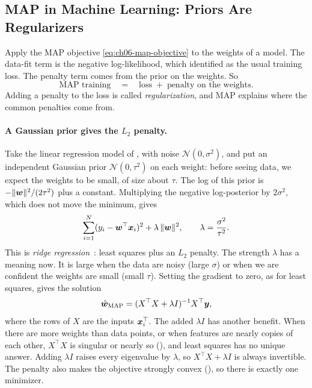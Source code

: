 \subsection{MAP in Machine Learning: Priors Are Regularizers}
\label{sec:ch06-map-ml}

Apply the MAP objective \eqref{eq:ch06-map-objective} to the weights of
a model. The data-fit term is the negative log-likelihood, which
 identified as the usual training loss. The
penalty term comes from the prior on the weights. So
\[
  \text{MAP training}
  \quad=\quad
  \text{loss} \;+\; \text{penalty on the weights}.
\]
Adding a penalty to the loss is called \emph{regularization}, and MAP
explains where the common penalties come from.

\paragraph{A Gaussian prior gives the $L_2$ penalty.}
Take the linear regression model of , with noise
$\mathcal{N}(0, \sigma^2)$, and put an independent Gaussian prior
$\mathcal{N}(0, \tau^2)$ on each weight: before seeing data, we expect
the weights to be small, of size about $\tau$. The log of this prior is
$-\|\bm{w}\|^2/(2\tau^2)$ plus a constant. Multiplying the negative
log-posterior by $2\sigma^2$, which does not move the minimum, gives
\[
  \sum_{i=1}^{N} (y_i - \bm{w}^\top\bm{x}_i)^2
  + \lambda\,\|\bm{w}\|^2,
  \qquad \lambda = \frac{\sigma^2}{\tau^2} .
\]
This is \emph{ridge regression}~\cite{hoerl1970ridge}: least squares plus an $L_2$ penalty. The
strength $\lambda$ has a meaning now. It is large when the data are noisy
(large $\sigma$) or when we are confident the weights are small (small
$\tau$). Setting the gradient to zero, as for least squares, gives the
solution
\begin{equation}
  \hat{\bm{w}}_{\text{MAP}} = (X^\top X + \lambda I)^{-1} X^\top \bm{y},
  \label{eq:ch06-ridge}
\end{equation}
where the rows of $X$ are the inputs $\bm{x}_i^\top$. The added
$\lambda I$ has another benefit. When there are more weights than data
points, or when features are nearly copies of each other, $X^\top X$ is
singular or nearly so (), and least squares has no
unique answer. Adding $\lambda I$ raises every eigenvalue by $\lambda$,
so $X^\top X + \lambda I$ is always invertible. The penalty also makes the
objective strongly convex (), so there is
exactly one minimizer.

